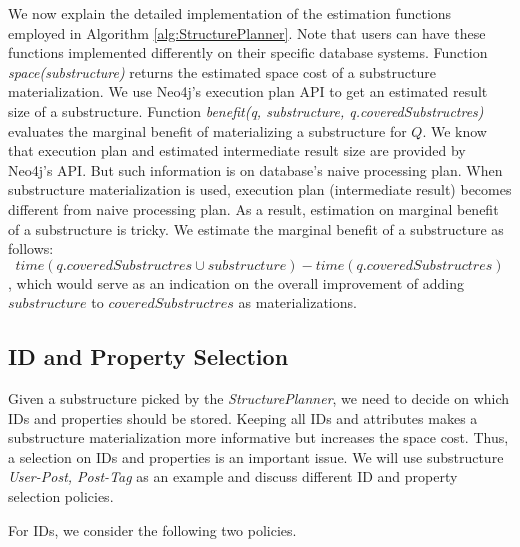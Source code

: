 We now explain the detailed implementation of the estimation functions employed in Algorithm \ref{alg:StructurePlanner}. Note that users can have these functions implemented differently on their specific database systems. Function \textit{space(substructure)} returns the estimated space cost of a substructure materialization. We use Neo4j's execution plan API to get an estimated result size of a substructure. Function \textit{benefit(q, substructure, q.coveredSubstructres)} evaluates the marginal benefit of materializing a substructure for $Q$. We know that execution plan and estimated intermediate result size are provided by Neo4j's API. But such information is on database's naive processing plan. When substructure materialization is used, execution plan (intermediate result) becomes different from naive processing plan. As a result, estimation on marginal benefit of a substructure is tricky. We estimate the marginal benefit of a substructure as follows:
\begin{displaymath}
time(q.coveredSubstructres \cup substructure) - time(q.coveredSubstructres)
\end{displaymath}
\noindent , which would serve as an indication on the overall improvement of adding $substructure$ to $coveredSubstructres$ as materializations. 


\subsection{ID and Property Selection}

Given a substructure picked by the \emph{StructurePlanner}, we need to decide on which IDs and properties should be stored. Keeping all IDs and attributes makes a substructure materialization more informative but increases the space cost. %
Thus, a selection on IDs and properties is an important issue. We will use substructure \textit{User-Post, Post-Tag} as an example and discuss different ID and property selection policies.

For IDs, we consider the following two policies.

